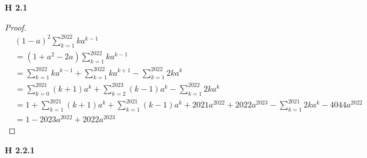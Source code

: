 \documentclass[12pt]{extarticle}
\begin{document}
\textbf{H 2.1}
\begin{proof}
  \begin{align*}
    &\left( 1-a \right)^2 \sum_{k=1}^{2022}{ka^{k-1}}\\
    &= \left( 1+a^2-2a \right) \sum_{k=1}^{2022}{ka^{k-1}}\\
    &=
      \sum_{k=1}^{2022}{ka^{k-1}}+\sum_{k=1}^{2022}{ka^{k+1}}-\sum_{k=1}^{2022}{2ka^k}\\
    &=\sum_{k=0}^{2021}{(k+1)a^k}+\sum_{k=2}^{2023}{(k-1)a^k}-\sum_{k=1}^{2022}{2ka^k}\\
    &=1+\sum_{k=1}^{2021}{(k+1)a^k}+\sum_{k=1}^{2021}{(k-1)a^k}+2021a^{2022}+2022a^{2023}-\sum_{k=1}^{2021}{2ka^k}-4044a^{2022}\\
    &=1-2023a^{2022}+2022a^{2023}
  \end{align*}
\end{proof}
\textbf{H 2.2.1}
\vspace{4mm}
\end{document}
